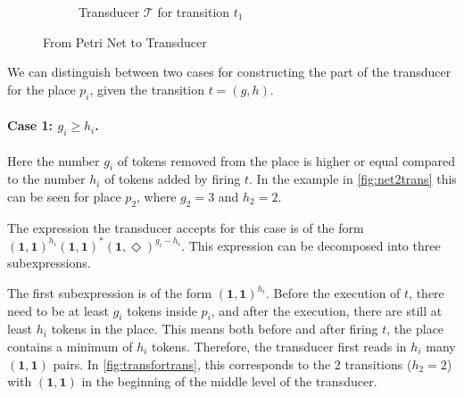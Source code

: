 \begin{figure}[H]
\begin{subfigure}{1\textwidth}
    	\caption{Transducer $\mathcal{T}$ for transition $t_{1}$}\label{fig:transfortrans}
\end{subfigure}
\caption{From Petri Net to Transducer}
\label{fig:net2trans}
\end{figure}



We can distinguish between two cases for constructing the part of the transducer for the place $p_{i}$, given the transition $t = (g,h)$.

\paragraph{Case 1: $g_{i} \ge h_{i}$.}

Here the number $g_{i}$ of tokens removed from the place is higher or equal compared to the number $h_{i}$ of tokens added by firing $t$. In the example in \autoref{fig:net2trans} this can be seen for place $p_{2}$, where $g_{2} = 3 $ and $h_{2} = 2$.

The expression the transducer accepts for this case is of the form $(\bm{1},\bm{1})^{h_{i}}(\bm{1},\bm{1})^{\bm{*}}(\bm{1},\Diamond)^{g_{i}-h_{i}}$. This expression can be decomposed into three subexpressions. 

The first subexpression is of the form $(\bm{1},\bm{1})^{h_{i}}$. Before the execution of $t$, there need to be at least $g_{i}$ tokens inside $p_{i}$, and after the execution, there are still at least $h_{i}$ tokens in the place. This means both before and after firing $t$, the place contains a minimum of $h_{i}$ tokens. Therefore, the transducer first reads in $h_{i}$ many $(\bm{1},\bm{1})$ pairs. In \autoref{fig:transfortrans}, this corresponds to the $2$ transitions ($h_{2} = 2$) with $(\bm{1},\bm{1})$ in the beginning of the middle level of the transducer.

